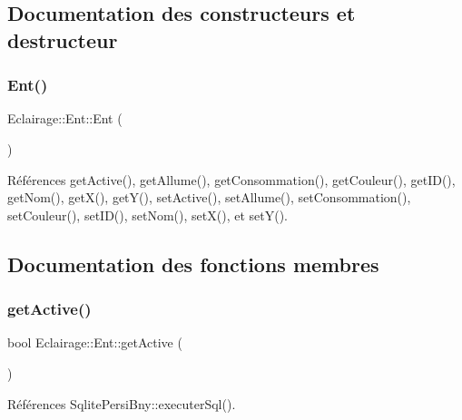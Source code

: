 \subsection{Documentation des constructeurs et destructeur}
\mbox{\label{classEclairage_1_1Ent_a2c185a5889bd49a541d9e1785b25322a}} 
\subsubsection{\texorpdfstring{Ent()}{Ent()}}
{\footnotesize\ttfamily Eclairage\+::\+Ent\+::\+Ent (\begin{DoxyParamCaption}{ }\end{DoxyParamCaption})\hspace{0.3cm}{\ttfamily [inline]}}



Références get\+Active(), get\+Allume(), get\+Consommation(), get\+Couleur(), get\+I\+D(), get\+Nom(), get\+X(), get\+Y(), set\+Active(), set\+Allume(), set\+Consommation(), set\+Couleur(), set\+I\+D(), set\+Nom(), set\+X(), et set\+Y().



\subsection{Documentation des fonctions membres}
\mbox{\label{classEclairage_1_1Ent_a7fdf3efdeb7ec2f649a79a1681db6e1e}} 
\subsubsection{\texorpdfstring{get\+Active()}{getActive()}}
{\footnotesize\ttfamily bool Eclairage\+::\+Ent\+::get\+Active (\begin{DoxyParamCaption}{ }\end{DoxyParamCaption})\hspace{0.3cm}{\ttfamily [virtual]}}



Références Sqlite\+Persi\+Bny\+::executer\+Sql().

\mbox{\label{classEclairage_1_1Ent_a6d968244e96edee75019717f95dbb1d2}} 
